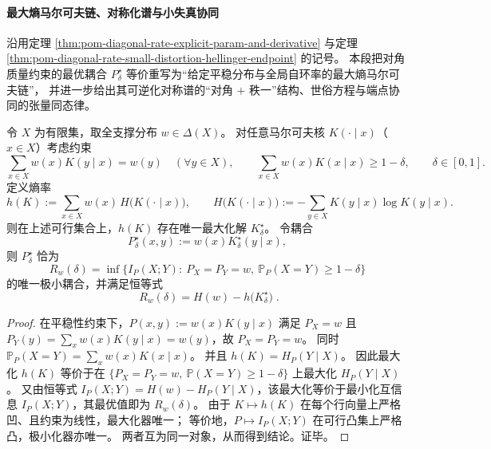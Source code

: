 
\paragraph{最大熵马尔可夫链、对称化谱与小失真协同}
沿用定理 \ref{thm:pom-diagonal-rate-explicit-param-and-derivative} 与定理 \ref{thm:pom-diagonal-rate-small-distortion-hellinger-endpoint} 的记号。
本段把对角质量约束的最优耦合 \(P^\star_\delta\) 等价重写为“给定平稳分布与全局自环率的最大熵马尔可夫链”，
并进一步给出其可逆化对称谱的“对角 \(+\) 秩一”结构、世俗方程与端点协同的张量同态律。

\begin{theorem}\label{thm:pom-maxent-markov-unique-optimal-kernel}
令 \(X\) 为有限集，取全支撑分布 \(w\in\Delta(X)\)。
对任意马尔可夫核 \(K(\cdot\mid x)\)（\(x\in X\)）考虑约束
\[
\sum_{x\in X}w(x)K(y\mid x)=w(y)\quad(\forall y\in X),
\qquad
\sum_{x\in X}w(x)K(x\mid x)\ge 1-\delta,\qquad \delta\in[0,1].
\]
定义熵率
\[
h(K):=\sum_{x\in X}w(x)\,H\!\bigl(K(\cdot\mid x)\bigr),
\qquad
H\!\bigl(K(\cdot\mid x)\bigr):=-\sum_{y\in X}K(y\mid x)\log K(y\mid x).
\]
则在上述可行集合上，\(h(K)\) 存在唯一最大化解 \(K^\star_\delta\)。
令耦合
\[
P^\star_\delta(x,y):=w(x)K^\star_\delta(y\mid x),
\]
则 \(P^\star_\delta\) 恰为
\[
R_w(\delta)=\inf\{I_P(X;Y):\ P_X=P_Y=w,\ \mathbb P_P(X=Y)\ge 1-\delta\}
\]
的唯一极小耦合，并满足恒等式
\[
\boxed{\;
R_w(\delta)=H(w)-h\!\bigl(K^\star_\delta\bigr)\; }.
\]
\end{theorem}
\begin{proof}
在平稳性约束下，\(P(x,y):=w(x)K(y\mid x)\) 满足 \(P_X=w\) 且
\(
P_Y(y)=\sum_x w(x)K(y\mid x)=w(y)
\)，故 \(P_X=P_Y=w\)。
同时
\(
\mathbb P_P(X=Y)=\sum_x w(x)K(x\mid x)
\)。
并且
\(
h(K)=H_P(Y\mid X)
\)。
因此最大化 \(h(K)\) 等价于在 \(\{P_X=P_Y=w,\ \mathbb P(X=Y)\ge 1-\delta\}\) 上最大化 \(H_P(Y\mid X)\)。
又由恒等式
\(
I_P(X;Y)=H(w)-H_P(Y\mid X)
\)，该最大化等价于最小化互信息 \(I_P(X;Y)\)，其最优值即为 \(R_w(\delta)\)。
由于 \(K\mapsto h(K)\) 在每个行向量上严格凹、且约束为线性，最大化器唯一；
等价地，\(P\mapsto I_P(X;Y)\) 在可行凸集上严格凸，极小化器亦唯一。
两者互为同一对象，从而得到结论。证毕。
\end{proof}

